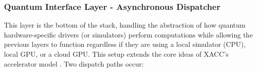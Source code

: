 
\subsubsection{Quantum Interface Layer - Asynchronous Dispatcher}
This layer is the bottom of the stack, handling the abstraction of how quantum hardware-specific drivers 
(or simulators) perform computations while allowing the previous layers to function regardless if they 
are using a local simulator (CPU), local GPU, or a cloud GPU. This setup extends the core ideas of XACC's accelerator model \parencite{mccaskey2018xacc}.   
Two dispatch paths occur:
